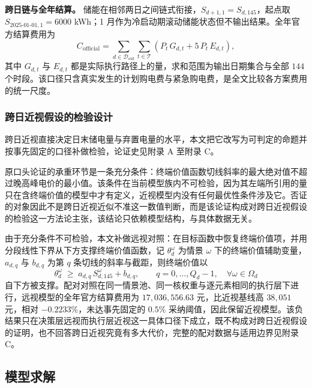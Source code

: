 \textbf{跨日链与全年结算。} 储能在相邻两日之间链式衔接，$S_{d+1,1}=S_{d,145}$，起点取 $S_{2025\text{-}01\text{-}01,1}=6000$ kWh；1 月作为冷启动期滚动储能状态但不输出结果。全年官方结算费用为
\begin{equation}
C_{\mathrm{official}} = \sum_{d \in \mathcal{D}_{\mathrm{out}}} \sum_{t \in \mathcal{T}} \left( P_t\, G_{d,t} + 5\, P_t\, E_{d,t} \right),\label{eq:official2}
\end{equation}
其中 $G_{d,t}$ 与 $E_{d,t}$ 都是实际执行路径上的量，求和范围为输出日期集合与全部 $144$ 个时段。该口径只含真实发生的计划购电费与紧急购电费，是全文比较各方案费用的统一尺度。

\subsubsection{跨日近视假设的检验设计}

跨日近视直接决定日末储电量与弃置电量的水平，本文把它改写为可判定的命题并按事先固定的口径补做检验，论证史见附录 A 至附录 C。

原口头论证的承重环节是一条充分条件：终端价值函数切线斜率的最大绝对值不超过晚高峰电价的最小值。该条件在当前模型族内不可检验，因为其左端所引用的量只在含终端价值的模型中才有定义，近视模型内没有任何最优性条件涉及它。否证的对象因此不是跨日近视近似不准这一数值判断，而是该论证构成对跨日近视假设的检验这一方法论主张，该结论只依赖模型结构，与具体数据无关。

由于充分条件不可检验，本文补做远视对照：在目标函数中恢复终端价值项，并用分段线性下界从下方支撑终端价值函数\cite{pereira}，记 $\theta^{\omega}_{d}$ 为情景 $\omega$ 下的终端价值辅助变量，$a_{d,q}$ 与 $b_{d,q}$ 为第 $q$ 条切线的斜率与截距，则终端价值以
\begin{equation}
\theta^{\omega}_{d} \;\ge\; a_{d,q}\, S^{\omega}_{d,145} + b_{d,q},
\qquad q = 0,\ldots,Q_d-1,\quad \forall \omega \in \Omega_d\label{eq:terminal2}
\end{equation}
自下方被支撑。配对对照在同一情景池、同一核权重与逐元素相同的执行层下进行，远视模型的全年官方结算费用为 $17{,}036{,}556.63$ 元，比近视基线高 $38{,}051$ 元，相对 $-0.2233\%$，未达事先固定的 $0.5\%$ 采纳阈值，因此保留近视模型。该负结果只在决策层远视而执行层近视这一具体口径下成立，既不构成对跨日近视假设的证明，也不回答跨日近视究竟有多大代价，完整的配对数据与适用边界见附录 C。

\subsection{模型求解}

